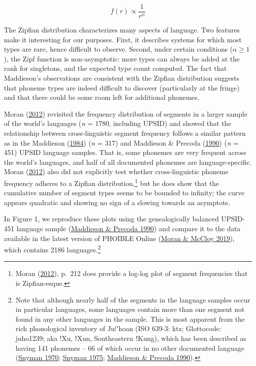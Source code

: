 \documentclass[
]{article}
\begin{document}
\[
f(r) \propto \frac{1}{r^\alpha}
\]

The Zipfian distribution characterizes many aspects of language. Two
features make it interesting for our purposes. First, it describes
systems for which most types are rare, hence difficult to observe.
Second, under certain conditions (\(\alpha \ge 1\)), the Zipf function
is non-asymptotic: more types can always be added at the rank for
singletons, and the expected type count computed. The fact that
Maddieson's observations are consistent with the Zipfian distribution
suggests that phoneme types are indeed difficult to discover
(particularly at the fringe) and that there could be some room left for
additional phonemes.

Moran (\protect\hyperlink{ref-Moran2012}{2012}) revisited the frequency
distribution of segments in a larger sample of the world's languages
(\emph{n} = 1780, including UPSID) and showed that the relationship
between cross-linguistic segment frequency follows a similar pattern as
in the Maddieson (\protect\hyperlink{ref-Maddieson1984}{1984}) (\emph{n}
= 317) and Maddieson \& Precoda
(\protect\hyperlink{ref-MaddiesonPrecoda1990}{1990}) (\emph{n} = 451)
UPSID language samples. That is, some phonemes are very frequent across
the world's languages, and half of all documented phonemes are
language-specific. Moran (\protect\hyperlink{ref-Moran2012}{2012}) also
did not explicitly test whether cross-linguistic phoneme frequency
adheres to a Zipfian distribution,\footnote{Moran
  (\protect\hyperlink{ref-Moran2012}{2012}), p.~212 does provide a
  log-log plot of segment frequencies that is Zipfian-esque.} but he
does show that the cumulative number of segment types seems to be
bounded to infinity; the curve appears quadratic and showing no sign of
a slowing towards an asymptote.

In Figure 1, we reproduce these plots using the genealogically balanced
UPSID-451 language sample
(\protect\hyperlink{ref-MaddiesonPrecoda1990}{Maddieson \& Precoda
1990}) and compare it to the data available in the latest version of
PHOIBLE Online (\protect\hyperlink{ref-MoranMcCloy2019}{Moran \& McCloy
2019}), which contains 2186 languages.\footnote{Note that although
  nearly half of the segments in the language samples occur in
  particular languages, some languages contain more than one segment not
  found in any other languages in the sample. This is most apparent from
  the rich phonological inventory of Juǀʼhoan (ISO 639-3: ktz;
  Glottocode: juho1239; aka !Xu, ǃXun, Southeastern ǃKung), which has
  been described as having 141 phonemes -- 66 of which occur in no other
  documented language (\protect\hyperlink{ref-Snyman1970}{Snyman 1970};
  \protect\hyperlink{ref-Snyman1975}{Snyman 1975};
  \protect\hyperlink{ref-MaddiesonPrecoda1990}{Maddieson \& Precoda
  1990}).}
\end{document}
